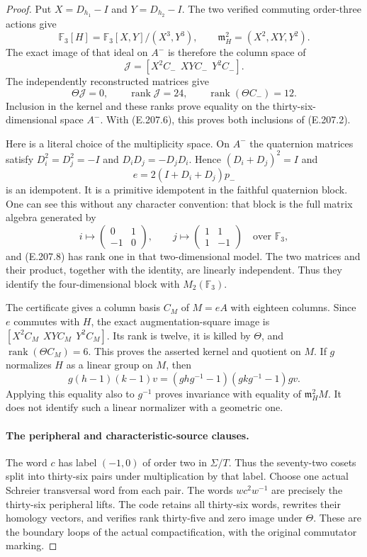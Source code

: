 \begin{proof}
Put $X=D_{h_1}-I$ and $Y=D_{h_2}-I$.  The two verified
commuting order-three actions give
\[
 \mathbb F_3[H]=\mathbb F_3[X,Y]/(X^3,Y^3),\qquad
 \mathfrak m_H^2=(X^2,XY,Y^2).
\]
The exact image of that ideal on $A^-$ is therefore the
column space of
\[
               \mathcal J=[X^2C_-\ \ XY C_-\ \ Y^2C_-].          \tag{E.207.7}
\]
The independently reconstructed matrices give
\[
 \Theta\mathcal J=0,\qquad \operatorname{rank}\mathcal J=24,
 \qquad \operatorname{rank}(\Theta C_-)=12.
\]
Inclusion in the kernel and these ranks prove equality on
the thirty-six-dimensional space $A^-$.  With (E.207.6),
this proves both inclusions of (E.207.2).

Here is a literal choice of the multiplicity space.  On $A^-$
the quaternion matrices satisfy
$D_i^2=D_j^2=-I$ and $D_iD_j=-D_jD_i$.  Hence
$(D_i+D_j)^2=I$ and
\[
                   e=2(I+D_i+D_j)p_-                            \tag{E.207.8}
\]
is an idempotent.  It is a primitive idempotent in the
faithful quaternion block.  One can see this without any
character convention: that block is the full matrix algebra
generated by
\[
 i\longmapsto\begin{pmatrix}0&1\\-1&0\end{pmatrix},\qquad
 j\longmapsto\begin{pmatrix}1&1\\1&-1\end{pmatrix}
       \quad\text{over }\mathbb F_3,
\]
and (E.207.8) has rank one in that two-dimensional model.
The two matrices and their product, together with the identity,
are linearly independent.  Thus they identify the
four-dimensional block with $M_2(\mathbb F_3)$.

The certificate gives a column basis $C_M$ of $M=eA$ with
eighteen columns.  Since $e$ commutes with $H$, the exact
augmentation-square image is
$[X^2C_M\ \ XY C_M\ \ Y^2C_M]$.  Its rank is twelve,
it is killed by $\Theta$, and
$\operatorname{rank}(\Theta C_M)=6$.  This proves the
asserted kernel and quotient on $M$.  If $g$ normalizes $H$
as a linear group on $M$, then
\[
 g(h-1)(k-1)v=(ghg^{-1}-1)(gkg^{-1}-1)gv.
\]
Applying this equality also to $g^{-1}$ proves invariance
with equality of $\mathfrak m_H^2M$.  It does not identify
such a linear normalizer with a geometric one.

\paragraph{The peripheral and characteristic-source clauses.}
The word $c$ has label $(-1,0)$ of order two in $\Sigma/T$.
Thus the seventy-two cosets split into thirty-six pairs
under multiplication by that label.  Choose one actual
Schreier transversal word from each pair.  The words
$w c^2w^{-1}$ are precisely the thirty-six peripheral
lifts.  The code retains all thirty-six words, rewrites
their homology vectors, and verifies rank thirty-five
and zero image under $\Theta$.  These are the boundary
loops of the actual compactification, with the original
commutator marking.


\end{proof}
